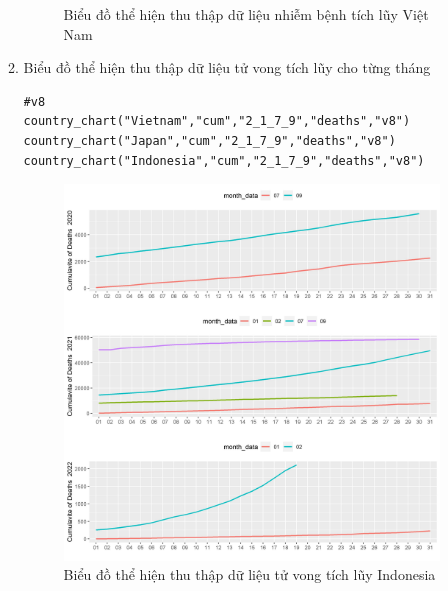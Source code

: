 \documentclass[a4paper]{article}
\theoremstyle{definition}
\begin{document}
\begin{enumerate}[i)]
\begin{enumerate}[1)]
\begin{figure}[htp]
		    \caption{Biểu đồ thể hiện thu thập dữ liệu nhiễm bệnh tích lũy Việt Nam}
		    \label{fig:my_label}
		 \end{figure}
    \newpage
    \item Biểu đồ thể hiện thu thập dữ liệu tử vong tích lũy cho từng tháng
    \begin{lstlisting}[frame=single]  
#v8
country_chart("Vietnam","cum","2_1_7_9","deaths","v8")
country_chart("Japan","cum","2_1_7_9","deaths","v8")
country_chart("Indonesia","cum","2_1_7_9","deaths","v8")
		\end{lstlisting}
		\begin{figure}[htp]
		    \centering
		    \includegraphics[scale = 0.7]{Images/V/v8 Indonesia .jpeg}
		    \caption{Biểu đồ thể hiện thu thập dữ liệu tử vong tích lũy Indonesia}
		    \label{fig:my_label}
		\end{figure}
		\begin{figure}[htp]
		    \centering

\end{figure}
\end{enumerate}
\end{enumerate}
\end{document}
